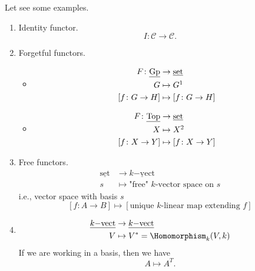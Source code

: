 \begin{eg}
	Let see some examples.
	\begin{enumerate}
		\item Identity functor.
		      \[
			      I\colon \mathscr{C} \to \mathscr{C}.
		      \]
		\item Forgetful functors.
		      \begin{itemize}
			      \item \[
				            \begin{split}
					            F\colon \underline{\mathrm{Gp}}&\to \underline{\mathrm{set}} \\
					            G&\mapsto G\footnotemark\\
					            \left[f\colon G\to H\right]&\mapsto \left[f\colon G\to H\right]
				            \end{split}
			            \]
			            \addtocounter{footnote}{-1}
			      \item \[
				            \begin{split}
					            F\colon \underline{\mathrm{Top}}&\to \underline{\mathrm{set}}\\
					            X&\mapsto X\footnotemark\\
					            \left[f\colon X\to Y\right]&\mapsto \left[f\colon X\to Y\right]
				            \end{split}
			            \]
			            \addtocounter{footnote}{-1}
		      \end{itemize}
		\item Free functors.
		      \[
			      \begin{split}
				      \underline{\mathrm{set}}&\to \underline{k\mathrm{-vect}}  \\
				      s&\mapsto \text{"free" \(k\)-vector space on \(s\)}
			      \end{split}
		      \]
		      i.e., vector space with basis \(s\)
		      \[
			      \left[f\colon A\to B\right]\mapsto \left[\text{unique \(k\)-linear map extending \(f\)}\right]
		      \]
		\item
		      \[
			      \begin{split}
				      \underline{k\mathrm{-vect}}&\to \underline{k\mathrm{-vect}}  \\
				      V&\mapsto V^{*} = \Homomorphism _k(V, k)
			      \end{split}
		      \]
		      If we are working in a basis, then we have
		      \[
			      A\mapsto A^{T}.
		      \]
	\end{enumerate}
\end{eg}

